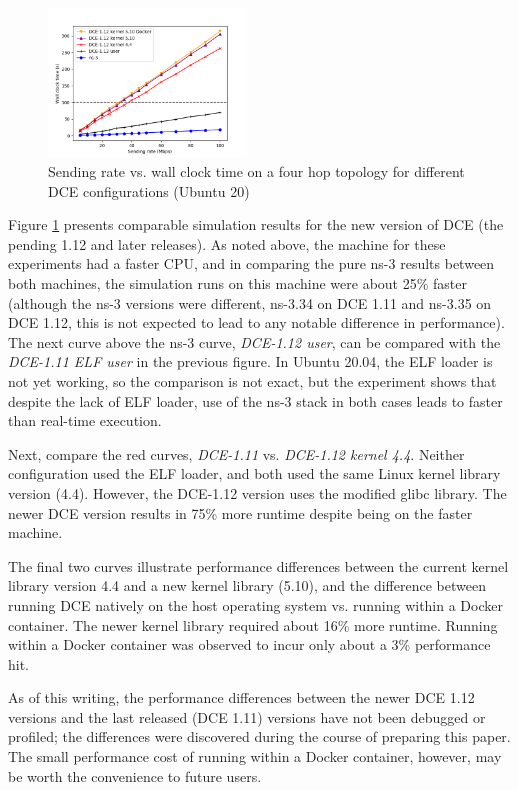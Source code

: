 \documentclass{sig-alternate}
\begin{document}
\begin{figure}[h!]
  \centering
    \includegraphics[width=0.47\textwidth]{figs/rate-vs-time-dce12.png}
  \caption{Sending rate vs. wall clock time on a four hop topology for different DCE configurations (Ubuntu 20)}
  \label{fig:rate-vs-time-u20}
\end{figure}

Figure \ref{fig:rate-vs-time-u20} presents comparable simulation results
for the new version of DCE (the pending 1.12 and later releases).  As noted
above, the machine for these experiments had a faster CPU, and in comparing
the pure ns-3 results between both machines, the simulation runs on this
machine were about 25\% faster (although the ns-3 versions were different,
ns-3.34 on DCE 1.11 and ns-3.35 on DCE 1.12, this is not expected to
lead to any notable difference in performance).  The next curve above
the ns-3 curve, \emph{DCE-1.12 user}, can be compared with the
\emph{DCE-1.11 ELF user} in the previous figure.  In Ubuntu 20.04, the
ELF loader is not yet working, so the comparison is not exact, but the
experiment shows that despite the lack of ELF loader, use of the ns-3
stack in both cases leads to faster than real-time execution.

Next, compare the red curves, \emph{DCE-1.11} vs. \emph{DCE-1.12 kernel 4.4}.
Neither configuration used the ELF loader, and both used the same Linux
kernel library version (4.4).  However, the DCE-1.12 version uses the
modified glibc library.  The newer DCE version results in 75\% more runtime
despite being on the faster machine.  

The final two curves illustrate performance differences between the current
kernel library version 4.4 and a new kernel library (5.10), and the
difference between running DCE natively on the host operating system vs.
running within a Docker container.  The newer kernel library required
about 16\% more runtime.   Running within a Docker container was observed
to incur only about a 3\% performance hit.

As of this writing, the performance differences between the newer DCE 1.12
versions and the last released (DCE 1.11) versions have not been debugged
or profiled; the differences were discovered during the course of preparing
this paper.  The small performance cost of running within a Docker container,
however, may be worth the convenience to future users.
\end{document}
